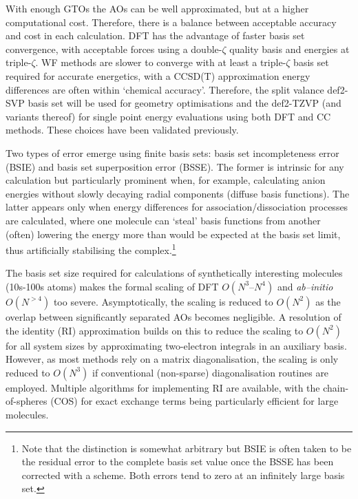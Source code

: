 \documentclass[main.tex]{subfiles}
\begin{document}
With enough GTOs the AOs can be well approximated, but at a higher computational cost. Therefore, there is a balance between acceptable accuracy and cost in each calculation. DFT has the advantage of faster basis set convergence,\cite{Jan1995} with acceptable forces using a double-$\zeta$ quality basis and energies at triple-$\zeta$.\cite{Sure2015chemopen} WF methods are slower to converge with at least a triple-$\zeta$ basis set required for accurate energetics, with a CCSD(T) approximation energy differences are often within `chemical accuracy'.\cite{Zhang2012} Therefore, the split valance def2-SVP basis set will be used for geometry optimisations and the def2-TZVP (and variants thereof) for single point energy evaluations using both DFT and CC methods. These choices have been validated previously.\cite{Kirschner2020}

Two types of error emerge using finite basis sets: basis set incompleteness error (BSIE) and basis set superposition error (BSSE). The former is intrinsic for any calculation but particularly prominent when, for example, calculating anion energies without slowly decaying radial components (diffuse basis functions). The latter appears only when energy differences for association/dissociation processes are calculated, where one molecule can `steal' basis functions from  another (often) lowering the energy more than would be expected at the basis set limit, thus artificially stabilising the complex.\footnote{Note that the distinction is somewhat arbitrary but BSIE is often taken to be the residual error to the complete basis set value once the BSSE has been corrected with a scheme. Both errors tend to zero at an infinitely large basis set.}\cite{BSSE1999}

The basis set size required for calculations of synthetically interesting molecules (10s-100s atoms) makes the formal scaling of DFT $O(N^3\mbox{--}N^4)$ and \emph{ab--initio} $O(N^{>4})$ too severe. Asymptotically, the scaling is reduced to $O(N^2)$ as the overlap between significantly separated AOs becomes negligible.\cite{Dyczmons1973} A resolution of the identity (RI) approximation builds on this to reduce the scaling to $O(N^2)$ for all system sizes by approximating two-electron integrals in an auxiliary basis.\cite{Hser1989} However, as most methods rely on a matrix diagonalisation, the scaling is only reduced to $O(N^3)$ if conventional (non-sparse) diagonalisation routines are employed. Multiple algorithms for implementing RI are available, with the chain-of-spheres (COS) for exact exchange terms being particularly efficient for large molecules.
\end{document}
